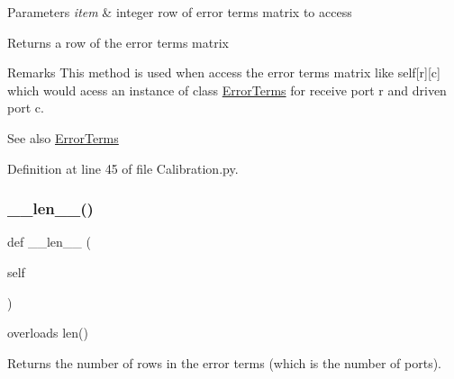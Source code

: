 \begin{DoxyParams}{Parameters}
{\em item} & integer row of error terms matrix to access \\
\hline
\end{DoxyParams}
\begin{DoxyReturn}{Returns}
a row of the error terms matrix 
\end{DoxyReturn}
\begin{DoxyRemark}{Remarks}
This method is used when access the error terms matrix like self\mbox{[}r\mbox{]}\mbox{[}c\mbox{]} which would acess an instance of class \hyperlink{namespaceSignalIntegrity_1_1Measurement_1_1Calibration_1_1ErrorTerms}{Error\+Terms} for receive port r and driven port c. 
\end{DoxyRemark}
\begin{DoxySeeAlso}{See also}
\hyperlink{namespaceSignalIntegrity_1_1Measurement_1_1Calibration_1_1ErrorTerms}{Error\+Terms} 
\end{DoxySeeAlso}


Definition at line 45 of file Calibration.\+py.

\mbox{\label{classSignalIntegrity_1_1Measurement_1_1Calibration_1_1Calibration_1_1Calibration_a810fdc262754b6d21f5acd0e280d4daf}} 
\subsubsection{\texorpdfstring{\+\_\+\+\_\+len\+\_\+\+\_\+()}{\_\_len\_\_()}}
{\footnotesize\ttfamily def \+\_\+\+\_\+len\+\_\+\+\_\+ (\begin{DoxyParamCaption}\item[{}]{self }\end{DoxyParamCaption})}



overloads len() 

\begin{DoxyReturn}{Returns}
the number of rows in the error terms (which is the number of ports). 
\end{DoxyReturn}


